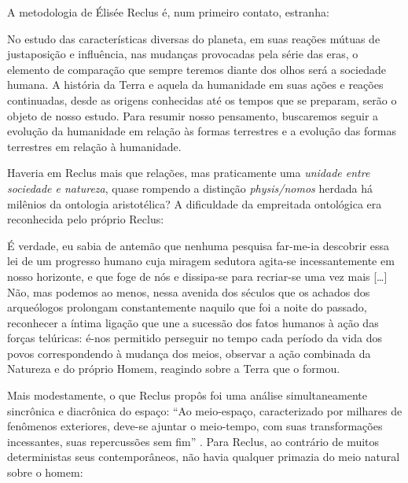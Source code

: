 A metodologia de Élisée Reclus é, num primeiro contato, estranha:

\begin{citacao}
No estudo das características diversas do planeta, em suas reações mútuas de justaposição e influência, nas mudanças provocadas pela série das eras, o elemento de comparação que sempre teremos diante dos olhos será a sociedade humana. A história da Terra e aquela da humanidade em suas ações e reações continuadas, desde as origens conhecidas até os tempos que se preparam, serão o objeto de nosso estudo. Para resumir nosso pensamento, buscaremos seguir a evolução da humanidade em relação às formas terrestres e a evolução das formas terrestres em relação à humanidade. \cite[pp.~78-79]{reclus_renovacao_2010}
\end{citacao}

Haveria em Reclus mais que relações, mas praticamente uma \textit{unidade entre sociedade e natureza}, quase rompendo a distinção \textit{physis/nomos }herdada há milênios da ontologia aristotélica? A dificuldade da empreitada ontológica era reconhecida pelo próprio Reclus:

\begin{citacao}
É verdade, eu sabia de antemão que nenhuma pesquisa far-me-ia descobrir essa lei de um progresso humano cuja miragem sedutora agita-se incessantemente em nosso horizonte, e que foge de nós e dissipa-se para recriar-se uma vez mais [{\dots}] Não, mas podemos ao menos, nessa avenida dos séculos que os achados dos arqueólogos prolongam constantemente naquilo que foi a noite do passado, reconhecer a íntima ligação que une a sucessão dos fatos humanos à ação das forças telúricas: é-nos permitido perseguir no tempo cada período da vida dos povos correspondendo à mudança dos meios, observar a ação combinada da Natureza e do próprio Homem, reagindo sobre a Terra que o formou. \cite[pp. 45-46]{reclus_renovacao_2010}
\end{citacao}

Mais modestamente, o que Reclus propôs foi uma análise simultaneamente sincrônica e diacrônica do espaço: ``Ao meio-espaço, caracterizado por milhares de fenômenos exteriores, deve-se ajuntar o meio-tempo, com suas transformações incessantes, suas repercussões sem fim'' \cite[p.~110]{RECLUS1905a}. Para Reclus, ao contrário de muitos deterministas seus contemporâneos, não havia qualquer primazia do meio natural sobre o homem:

